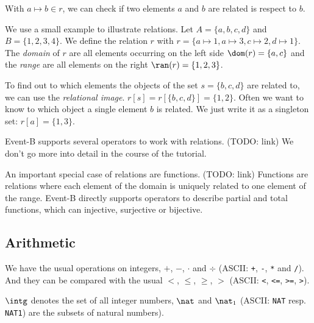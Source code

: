 With $a\mapsto b\in r$, we can check if two elements $a$ and $b$ are related is respect to $b$.

We use a small example to illustrate relations. Let $A = \{a,b,c,d\}$ and $B=\{1,2,3,4\}$.
We define the relation $r$ with $r = \{a\mapsto 1, a\mapsto 3, c\mapsto 2, d\mapsto 1\}$.
The \emph{domain} of $r$ are all elements occurring on the left side $\dom(r) = \{a,c\}$ and the
\emph{range} are all elements on the right $\ran(r)=\{1,2,3\}$.

To find out to which elements the objects of the set $s=\{b,c,d\}$ are related to, we can use the \emph{relational image}.
$r[s] = r[\{b,c,d\}] = \{1,2\}$.
Often we want to know to which object a single element $b$ is related. We just write it as a singleton
set: $r[{a}] = \{1,3\}$.

Event-B supports several operators to work with relations. (TODO: link)
We don't go more into detail in the course of the tutorial.

An important special case of relations are functions. (TODO: link) Functions are relations where each element of the
domain is uniquely related to one element of the range. Event-B directly supports operators to describe
partial and total functions, which can injective, surjective or bijective.

\subsection{Arithmetic}
\label{tut:arithmetic}
We have the usual operations on integers, $+$, $-$, $\cdot$ and $\div$ (ASCII: \texttt{+}, \texttt{-},
\texttt{*} and \texttt{/}). And they can be compared with the usual $<$, $\leq$, $\geq$, $>$ (ASCII: \texttt{<}, \texttt{<=}, \texttt{>=}, \texttt{>}).

$\intg$  denotes the set of all integer numbers, $\nat$ and $\nat_1$ (ASCII: \texttt{NAT} resp. 
\texttt{NAT1}) are the subsets of natural numbers).


